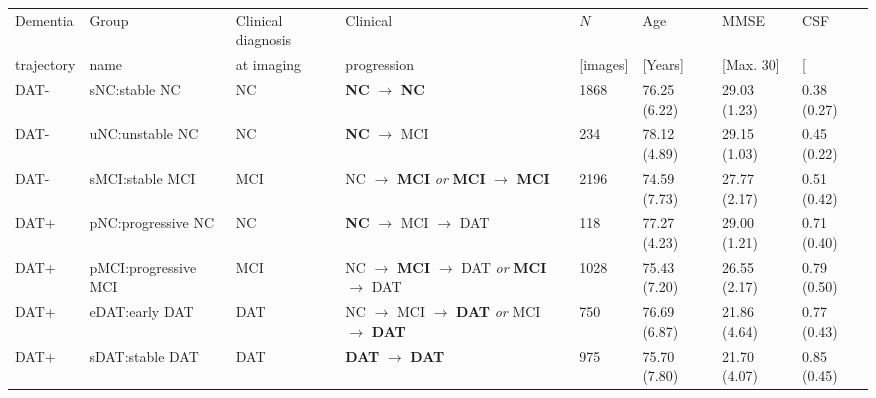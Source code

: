 \setlength{\tabcolsep}{0.07in}\begin{tabular}{*{8}{l}}
\hline
Dementia & Group & Clinical diagnosis & Clinical & $N$ & Age & MMSE & CSF\\
trajectory & name & at imaging & progression & {[}images{]} & {[}Years{]} & {[}Max. 30{]} & {[}\TauAbetaRatio{]}\\
\hline
DAT- & sNC:stable NC & NC & \textbf{NC} $\rightarrow$ \textbf{NC} & 1868 & 76.25 (6.22) & 29.03 (1.23) & 0.38 (0.27)\\
DAT- & uNC:unstable NC & NC & \textbf{NC} $\rightarrow$ MCI & 234 & 78.12 (4.89) & 29.15 (1.03) & 0.45 (0.22)\\
DAT- & sMCI:stable MCI & MCI & NC $\rightarrow$ \textbf{MCI} \textit{or} \textbf{MCI} $\rightarrow$ \textbf{MCI} & 2196 & 74.59 (7.73) & 27.77 (2.17) & 0.51 (0.42)\\
\hline
DAT+ & pNC:progressive NC & NC & \textbf{NC} $\rightarrow$ MCI $\rightarrow$ DAT & 118 & 77.27 (4.23) & 29.00 (1.21) & 0.71 (0.40)\\
DAT+ & pMCI:progressive MCI & MCI & NC $\rightarrow$ \textbf{MCI} $\rightarrow$ DAT \textit{or} \textbf{MCI} $\rightarrow$ DAT & 1028 & 75.43 (7.20) & 26.55 (2.17) & 0.79 (0.50)\\
DAT+ & eDAT:early DAT & DAT & NC $\rightarrow$ MCI $\rightarrow$ \textbf{DAT} \textit{or} MCI $\rightarrow$ \textbf{DAT} & 750 & 76.69 (6.87) & 21.86 (4.64) & 0.77 (0.43)\\
DAT+ & sDAT:stable DAT & DAT & \textbf{DAT} $\rightarrow$ \textbf{DAT} & 975 & 75.70 (7.80) & 21.70 (4.07) & 0.85 (0.45)\\
\hline
\end{tabular}
